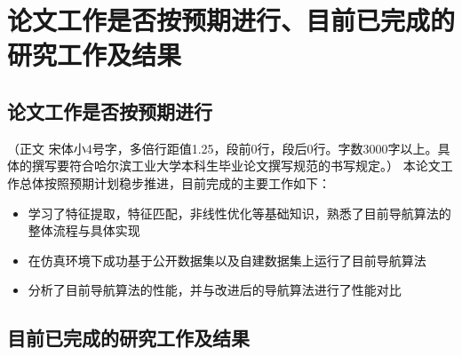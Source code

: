 \section{论文工作是否按预期进行、目前已完成的研究工作及结果}
\subsection{论文工作是否按预期进行}
（正文  宋体小4号字，多倍行距值1.25，段前0行，段后0行。字数3000字以上。具体的撰写要符合哈尔滨工业大学本科生毕业论文撰写规范的书写规定。）
本论文工作总体按照预期计划稳步推进，目前完成的主要工作如下：
\begin{itemize}
    \item 学习了特征提取，特征匹配，非线性优化等基础知识，熟悉了目前导航算法的整体流程与具体实现
    \item 在仿真环境下成功基于公开数据集以及自建数据集上运行了目前导航算法
    \item 分析了目前导航算法的性能，并与改进后的导航算法进行了性能对比
\end{itemize}

\subsection{目前已完成的研究工作及结果}
